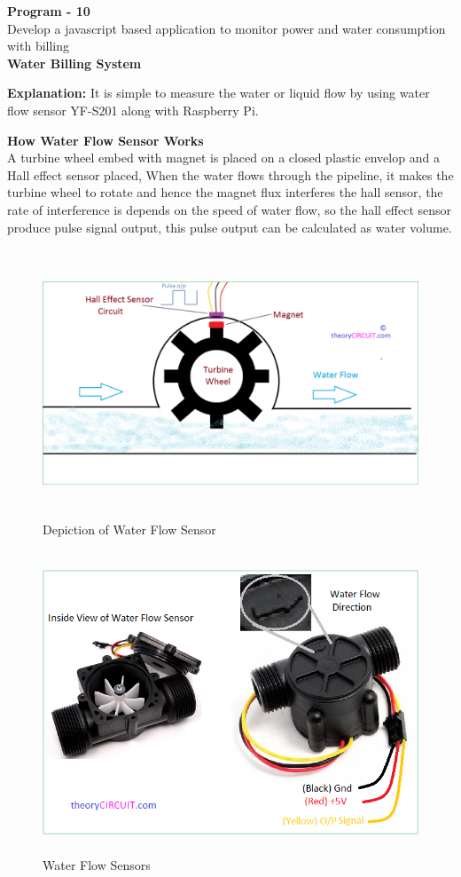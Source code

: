 \documentclass[12pt,a4paper]{article}
\begin{document}
\begin{center}
{\large {\textbf{Program - 10}}\\
Develop a javascript based application to monitor power and water consumption with billing \\}
\vspace{5mm}
\textbf{Water Billing System}
\end{center}
\begin{flushleft}
\textbf{Explanation:} It is simple to measure the water or liquid flow by using water flow sensor YF-S201 along with Raspberry Pi.
\vspace{5mm}

\textbf{How Water Flow Sensor Works}\\
A turbine wheel embed with magnet is placed on a closed plastic envelop and a Hall effect sensor placed, When the water flows through the pipeline, it makes the turbine wheel to rotate and hence the magnet flux interferes the hall sensor, the rate of interference is depends on the speed of water flow, so the hall effect sensor produce pulse signal output, this pulse output can be calculated as water volume.
\vspace{5mm}
\begin{figure}[h!]
    \centering
	\includegraphics[width=17cm, height=8cm]{Lab10_1.png}
	\caption{Depiction of Water Flow Sensor}
\end{figure}

\begin{figure}[h!]
    \centering
	\includegraphics[width=13cm, height=9cm]{Lab10_2.png}
	\caption{Water Flow Sensors}
\end{figure}


\end{flushleft}
\end{document}
